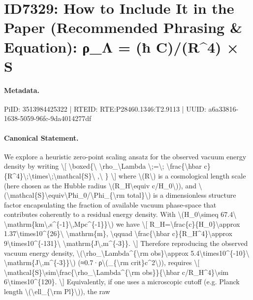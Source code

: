 \section*{ID7329: How to Include It in the Paper (Recommended Phrasing \& Equation): ρ\_Λ = (ħ C)/(R\textasciicircum{}4) × S}
\paragraph{Metadata.}
PiID: 3513984425322 | RTEID: RTE:P28460.1346:T2.9113 | UUID: a6a33816-1638-5059-96fc-9da4014277df

\paragraph{Canonical Statement.}
We explore a heuristic zero-point scaling ansatz for the observed vacuum energy density by writing \textbackslash{}[ \textbackslash{}boxed\{\textbackslash{} \textbackslash{}rho\_\textbackslash{}Lambda \textbackslash{};=\textbackslash{}; \textbackslash{}frac\{\textbackslash{}hbar c\}\{R\textasciicircum{}4\}\textbackslash{};\textbackslash{}times\textbackslash{};\textbackslash{}mathcal\{S\}\textbackslash{} ,\textbackslash{} \} \textbackslash{}] where \textbackslash{}(R\textbackslash{}) is a cosmological length scale (here chosen as the Hubble radius \textbackslash{}(R\_H\textbackslash{}equiv c/H\_0\textbackslash{})), and \textbackslash{}(\textbackslash{}mathcal\{S\}\textbackslash{}equiv\textbackslash{}Phi\_0/\textbackslash{}Phi\_\{\textbackslash{}rm total\}\textbackslash{}) is a dimensionless structure factor encapsulating the fraction of available vacuum phase-space that contributes coherently to a residual energy density. With \textbackslash{}(H\_0\textbackslash{}simeq 67.4\textbackslash{} \textbackslash{}mathrm\{km\textbackslash{},s\textasciicircum{}\{-1\}\textbackslash{},Mpc\textasciicircum{}\{-1\}\}\textbackslash{}) we have \textbackslash{}[ R\_H=\textbackslash{}frac\{c\}\{H\_0\}\textbackslash{}approx 1.37\textbackslash{}times10\textasciicircum{}\{26\}\textbackslash{} \textbackslash{}mathrm\{m\}, \textbackslash{}qquad \textbackslash{}frac\{\textbackslash{}hbar c\}\{R\_H\textasciicircum{}4\}\textbackslash{}approx 9\textbackslash{}times10\textasciicircum{}\{-131\}\textbackslash{} \textbackslash{}mathrm\{J\textbackslash{},m\textasciicircum{}\{-3\}\}. \textbackslash{}] Therefore reproducing the observed vacuum energy density, \textbackslash{}(\textbackslash{}rho\_\textbackslash{}Lambda\textasciicircum{}\{\textbackslash{}rm obs\}\textbackslash{}approx 5.4\textbackslash{}times10\textasciicircum{}\{-10\}\textbackslash{} \textbackslash{}mathrm\{J\textbackslash{},m\textasciicircum{}\{-3\}\}\textbackslash{}) (≈0.7·ρ\textbackslash{}(\_\{\textbackslash{}rm crit\}c\textasciicircum{}2\textbackslash{})), requires \textbackslash{}[ \textbackslash{}mathcal\{S\}\textbackslash{}sim\textbackslash{}frac\{\textbackslash{}rho\_\textbackslash{}Lambda\textasciicircum{}\{\textbackslash{}rm obs\}\}\{\textbackslash{}hbar c/R\_H\textasciicircum{}4\}\textbackslash{}sim 6\textbackslash{}times10\textasciicircum{}\{120\}. \textbackslash{}] Equivalently, if one uses a microscopic cutoff (e.g. Planck length \textbackslash{}(\textbackslash{}ell\_\{\textbackslash{}rm Pl\}\textbackslash{})), the raw 